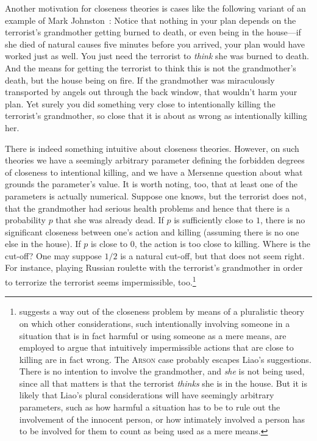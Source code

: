 Another motivation for closeness theories is cases like the following variant of an example
of Mark Johnston~\parencite[p.~338]{DelaneyCloseness}:
Notice that nothing in your plan depends on the terrorist's grandmother getting burned to
death, or even being in the house---if she died of natural causes five minutes before you arrived,
your plan would have worked just as well. You just need the terrorist to \textit{think} 
she was burned to death. And the means
for getting the terrorist to think this is not the grandmother's death, but the house being
on fire. If the grandmother was miraculously transported by angels out through the back window,
that wouldn't harm your plan. Yet surely you did something very close to intentionally killing
the terrorist's grandmother, so close that it is about as wrong as intentionally killing her.

There is indeed something intuitive about closeness theories. However, on such theories we have a seemingly arbitrary 
parameter defining the forbidden degrees of closeness to intentional killing, and we have a Mersenne question about what
grounds the parameter's value. It is worth noting, too, that at least one of the parameters is actually numerical. Suppose
one knows, but the terrorist does not, that the grandmother had serious health problems and hence that there is a
probability $p$ that she was already dead. If $p$ is sufficiently close to $1$, there is no significant closeness 
between one's action and killing (assuming there is no one else in the house).  If $p$ is close to $0$, the action
is too close to killing. Where is the cut-off? One may suppose $1/2$ is a natural cut-off, but that does not seem
right. For instance, playing Russian roulette with the terrorist's grandmother in order to terrorize the terrorist
seems impermissible, too.\footnote{
suggests a way out of the closeness problem by means of a pluralistic theory on which other considerations, 
such intentionally involving someone in a situation that is in fact harmful or using someone as a mere means,
are employed to argue that intuitively impermissible actions that are close to killing are in fact wrong.
The \textsc{Arson} case probably escapes Liao's suggestions. There is no intention to involve the grandmother,
and \textit{she} is not being used, since all that matters is that the terrorist \textit{thinks} she is in the house.
But it is likely that Liao's plural considerations will have seemingly arbitrary parameters, such as how harmful
a situation has to be to rule out the involvement of the innocent person, or how intimately involved a person has
to be involved for them to count as being used as a mere means.}

